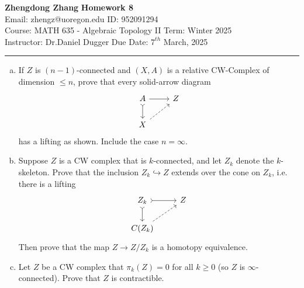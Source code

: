 \documentclass[letterpaper, 12pt]{article}
\begin{document}
\noindent
\large\textbf{Zhengdong Zhang} \hfill \textbf{Homework 8}   \\
Email: zhengz@uoregon.edu \hfill ID: 952091294 \\
\normalsize Course: MATH 635 - Algebraic Topology II \hfill Term: Winter 2025\\
Instructor: Dr.Daniel Dugger \hfill Due Date: $7^{th}$ March, 2025 \\
\noindent\rule{7in}{2.8pt}

\begin{problem}{1}
\begin{enumerate}[(a)]
\item If \(Z\) is \((n-1)\)-connected and \((X,A)\) is a relative CW-Complex of dimension \(\leq n\), prove that every solid-arrow diagram 
\[\begin{tikzcd}
	A & Z \\
	X
	\arrow[from=1-1, to=1-2]
	\arrow[tail, from=1-1, to=2-1]
	\arrow[dashed, from=2-1, to=1-2]
\end{tikzcd}\]
has a lifting as shown. Include the case \(n=\infty\). 
\item Suppose \(Z\) is a CW complex that is \(k\)-connected, and let \(Z_k\) denote the \(k\)-skeleton. Prove that the inclusion \(Z_k\hookrightarrow Z\) extends over the cone on \(Z_k\), i.e. there is a lifting 
\[\begin{tikzcd}
	{Z_k} & Z \\
	{C(Z_k)}
	\arrow[tail, from=1-1, to=1-2]
	\arrow[tail, from=1-1, to=2-1]
	\arrow[dashed, from=2-1, to=1-2]
\end{tikzcd}\]
Then prove that the map \(Z\rightarrow Z/Z_k\) is a homotopy equivalence. 
\item Let \(Z\) be a CW complex that \(\pi_k(Z)=0\) for all \(k\geq 0\) (so \(Z\) is \(\infty\)-connected). Prove that \(Z\) is contractible.
\end{enumerate}
\end{problem}
\end{document}
